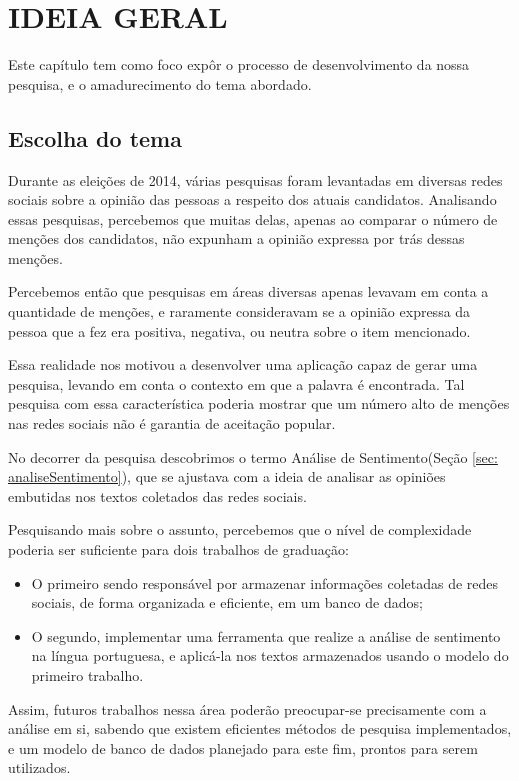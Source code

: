 \chapter{IDEIA GERAL}
\label{conceituacaoEIdeiaGeral} %
Este capítulo tem como foco expôr o processo de desenvolvimento da nossa pesquisa, e o amadurecimento do tema abordado.

\section{Escolha do tema}
\label{sec: escolhaDoTema}
Durante as eleições de 2014, várias pesquisas foram levantadas em diversas redes sociais sobre a opinião das pessoas a respeito dos atuais candidatos. Analisando essas pesquisas, percebemos que muitas delas, apenas ao comparar o número de menções dos candidatos, não expunham a opinião expressa por trás dessas menções.

Percebemos então que pesquisas em áreas diversas apenas levavam em conta a quantidade de menções, e raramente consideravam se a opinião expressa da pessoa que a fez era positiva, negativa, ou neutra sobre o item mencionado.

Essa realidade nos motivou a desenvolver uma aplicação capaz de gerar uma pesquisa, levando em conta o contexto em que a palavra é encontrada. Tal pesquisa com essa característica poderia mostrar que um número alto de menções nas redes sociais não é garantia de aceitação popular.

No decorrer da pesquisa descobrimos o termo Análise de Sentimento(Seção \ref{sec: analiseSentimento}), que se ajustava com a ideia de analisar as opiniões embutidas nos textos coletados das redes sociais.

Pesquisando mais sobre o assunto, percebemos que o nível de complexidade poderia ser suficiente para dois trabalhos de graduação:
\begin{itemize}
    \item O primeiro sendo responsável por armazenar informações coletadas de redes sociais, de forma organizada e eficiente, em um banco de dados;
    \item O segundo, implementar uma ferramenta que realize a análise de sentimento na língua portuguesa, e aplicá-la nos textos armazenados usando o modelo do primeiro trabalho.
\end{itemize}

Assim, futuros trabalhos nessa área poderão preocupar-se precisamente com a análise em si, sabendo que existem eficientes métodos de pesquisa implementados, e um modelo de banco de dados planejado para este fim, prontos para serem utilizados.

